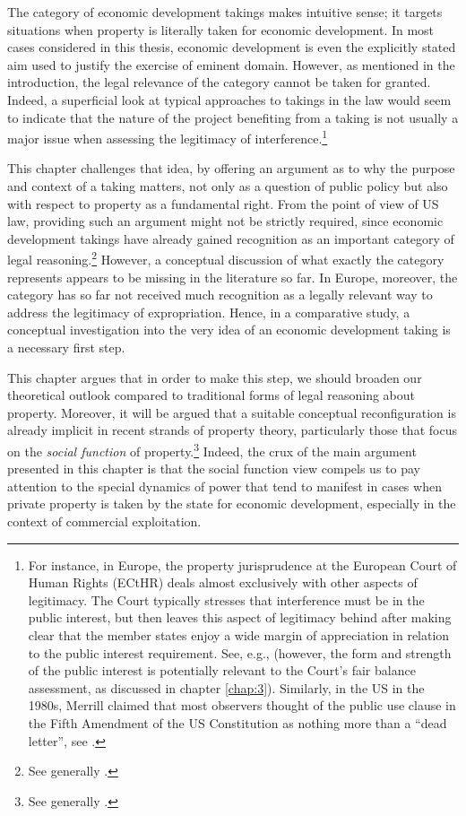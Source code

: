 The category of economic development takings makes intuitive sense; it targets situations when property is literally taken for economic development. In most cases considered in this thesis, economic development is even the explicitly stated aim used to justify the exercise of eminent domain. However, as mentioned in the introduction, the legal relevance of the category cannot be taken for granted. Indeed, a superficial look at typical approaches to takings in the law would seem to indicate that the nature of the project benefiting from a taking is not usually a major issue when assessing the legitimacy of interference.\footnote{For instance, in Europe, the property jurisprudence at the European Court of Human Rights (ECtHR) deals almost exclusively with other aspects of legitimacy. The Court typically stresses that interference must be in the public interest, but then leaves this aspect of legitimacy behind after making clear that the member states enjoy a wide margin of appreciation in relation to the public interest requirement. See, e.g., \cite{james86,lindheim12} (however, the form and strength of the public interest is potentially relevant to the Court's fair balance assessment, as discussed in chapter \ref{chap:3}). Similarly, in the US in the 1980s, Merrill claimed that most observers thought of the public use clause in the Fifth Amendment of the US Constitution as nothing more than a ``dead letter'', see \cite[61]{merrill86}.} 

This chapter challenges that idea, by offering an argument as to why the purpose and context of a taking matters, not only as a question of public policy but also with respect to property as a fundamental right. From the point of view of US law, providing such an argument might not be strictly required, since economic development takings have already gained recognition as an important category of legal reasoning.\footnote{See generally \cite{cohen06,somin07,malloy08}.} However, a conceptual discussion of what exactly the category represents appears to be missing in the literature so far. In Europe, moreover, the category has so far not received much recognition as a legally relevant way to address the legitimacy of expropriation. Hence, in a comparative study, a conceptual investigation into the very idea of an economic development taking is a necessary first step.

This chapter argues that in order to make this step, we should broaden our theoretical outlook compared to traditional forms of legal reasoning about property. Moreover, it will be argued that a suitable conceptual reconfiguration is already implicit in recent strands of property theory, particularly those that focus on the {\it social function} of property.\footnote{See generally \cite{alexander09a,foster11,singer00,underkuffler03,alexander06,alexander10,dagan11}.} Indeed, the crux of the main argument presented in this chapter is that the social function view compels us to pay attention to the special dynamics of power that tend to manifest in cases when private property is taken by the state for economic development, especially in the context of commercial exploitation.

